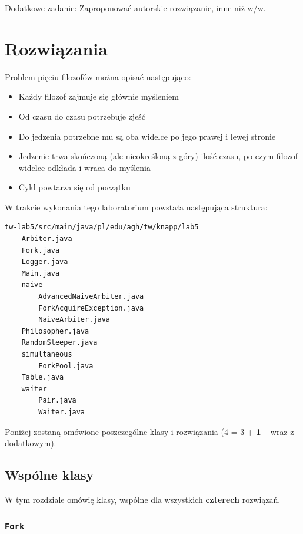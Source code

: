 \documentclass[11pt]{article}
\providecommand{\tightlist}{%
      \setlength{\itemsep}{0pt}\setlength{\parskip}{0pt}}
\begin{document}
Dodatkowe zadanie: Zaproponować autorskie rozwiązanie, inne niż w/w.

    \hypertarget{rozwiux105zania}{%
\section{Rozwiązania}\label{rozwiux105zania}}

Problem pięciu filozofów można opisać następująco:

\begin{itemize}
\tightlist
\item
  Każdy filozof zajmuje się głównie myśleniem
\item
  Od czasu do czasu potrzebuje zjeść
\item
  Do jedzenia potrzebne mu są oba widelce po jego prawej i lewej stronie
\item
  Jedzenie trwa skończoną (ale nieokreśloną z góry) ilość czasu, po czym
  filozof widelce odkłada i wraca do myślenia
\item
  Cykl powtarza się od początku
\end{itemize}

W trakcie wykonania tego laboratorium powstała następująca struktura:

\begin{verbatim}
tw-lab5/src/main/java/pl/edu/agh/tw/knapp/lab5
    Arbiter.java
    Fork.java
    Logger.java
    Main.java
    naive
        AdvancedNaiveArbiter.java
        ForkAcquireException.java
        NaiveArbiter.java
    Philosopher.java
    RandomSleeper.java
    simultaneous
        ForkPool.java
    Table.java
    waiter
        Pair.java
        Waiter.java
\end{verbatim}

Poniżej zostaną omówione poszczególne klasy i rozwiązania (4 = 3 +
\textbf{1} -- wraz z dodatkowym).

    \hypertarget{wspuxf3lne-klasy}{%
\subsection{Wspólne klasy}\label{wspuxf3lne-klasy}}

W tym rozdziale omówię klasy, wspólne dla wszystkich \textbf{czterech}
rozwiązań.

    \hypertarget{fork}{%
\subsubsection{\texorpdfstring{\texttt{Fork}}{Fork}}\label{fork}}
\end{document}
